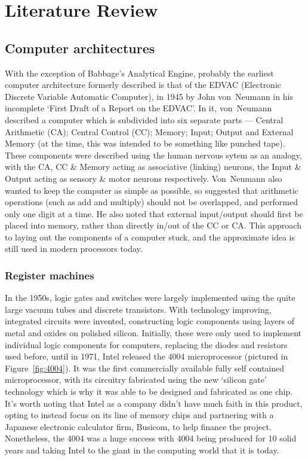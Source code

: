 \chapter{Literature Review}\label{ch:litreview}
\section{Computer architectures}
With the exception of Babbage's Analytical Engine, probably the earliest
computer architecture formerly described is that of the EDVAC (Electronic
Discrete Variable Automatic Computer), in 1945 by John von~Neumann in his
incomplete `First Draft of a Report on the EDVAC'. In it, von~Neumann described
a computer which is subdivided into six separate parts --- Central Arithmetic
(CA); Central Control (CC); Memory; Input; Output and External Memory (at the
time, this was intended to be something like punched tape). These components
were described using the human nervous sytem as an analogy, with the CA, CC \&
Memory acting as associative (linking) neurons, the Input \& Output acting as
sensory \& motor neurons respectively.
Von~Neumann also wanted to keep the computer as simple as possible, so suggested
that arithmetic operations (such as add and multiply) should not be overlapped,
and performed only one digit at a time. He also noted that external input/output
should first be placed into memory, rather than directly in/out of the CC or
CA\@.
This approach to laying out the components of a computer stuck, and the
approximate idea is still used in modern processors today.\cite{FirstDraft}

\subsection{Register machines}
In the 1950s, logic gates and switches were largely implemented using the quite
large vacuum tubes and discrete transistors. With technology improving,
integrated circuits were invented, constructing logic components using layers of
metal and oxides on polished silicon. Initially, these were only used to
implement individual logic components for computers, replacing the diodes and
resistors used before, until in 1971, Intel released the 4004 microprocessor
(pictured in Figure~\ref{fig:4004}).
It was the first commercially available fully self contained microprocessor,
with its circuitry fabricated using the new `silicon gate' technology which is
why it was able to be designed and fabricated as one chip. It's worth noting
that Intel as a company didn't have much faith in this product, opting to
instead focus on its line of memory chips and partnering with a Japanese
electronic calculator firm, Busicom, to help finance the project. Nonetheless,
the 4004 was a huge success with 4004 being produced for 10 solid years and
taking Intel to the giant in the computing world that it is
today.\cite{Aspray1997Intel}

